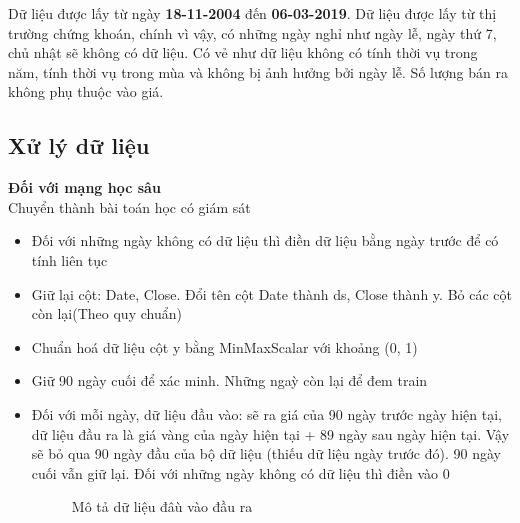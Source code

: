 Dữ liệu được lấy từ ngày \textbf{18-11-2004} đến \textbf{06-03-2019}. 
Dữ liệu được lấy từ thị trường chứng khoán, chính vì vậy, có những ngày nghỉ như ngày lễ, ngày thứ 7, chủ nhật sẽ không có dữ liệu.
Có vẻ như dữ liệu không có tính thời vụ trong năm, tính thời vụ trong mùa và không bị ảnh hưởng bởi ngày lễ. Số lượng bán ra không phụ thuộc vào giá.

\subsection{Xử lý dữ liệu}

\textbf{Đối với mạng học sâu} \\
Chuyển thành bài toán học có giám sát
\begin{itemize}
    \item Đối với những ngày không có dữ liệu thì điền dữ liệu bằng ngày trước để có tính liên tục \\
    \item Giữ lại cột: Date, Close. Đổi tên cột Date thành ds, Close thành y. Bỏ các cột còn lại(Theo quy chuẩn) \\
    \item Chuẩn hoá dữ liệu cột y bằng MinMaxScalar với khoảng (0, 1) \\
    \item Giữ 90 ngày cuối để xác minh. Những ngaỳ còn lại để đem train \\
	\item Đối với mỗi ngày, dữ liệu đầu vào: sẽ ra giá của 90 ngày trước ngày hiện tại, dữ liệu đầu ra là giá vàng của ngày hiện tại +  89 ngày sau ngày hiện tại. Vậy sẽ bỏ qua 90 ngày đầu của bộ dữ liệu (thiếu dữ liệu ngày trước đó). 90 ngày cuối vẫn giữ lại. Đối với những ngày không có dữ liệu thì điền vào 0 \\
	\begin{figure}[h]
		\caption{\label{fig:preprocessing} Mô tả dữ liệu đâù vào đầu ra}
	\end{figure}
\end{itemize}
